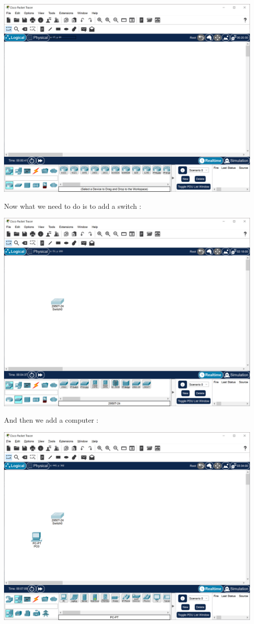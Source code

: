\documentclass[a4paper,12pt]{article}
\begin{document}
\noindent \includegraphics[width=13cm]{./step-by-step/0.PNG}
\clearpage

\noindent Now what we need to do is to add a switch : \newline

\noindent \includegraphics[width=13cm]{./step-by-step/1.PNG}
\clearpage

\noindent And then we add a computer : \newline

\noindent \includegraphics[width=13cm]{./step-by-step/2.PNG}
\clearpage
\end{document}
